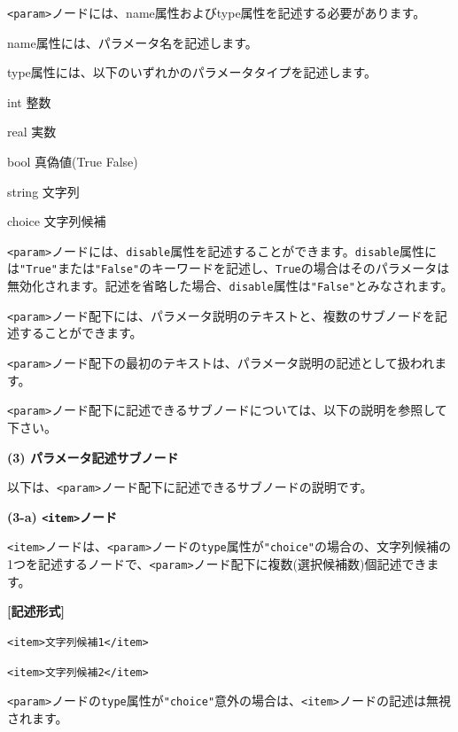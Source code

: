 \documentclass[a4paper,11pt]{jarticle}
\begin{document}
{\vspace{8pt}
\leftskip=0pt
\texttt{<param>}ノードには、name属性およびtype属性を記述する必要があります。

name属性には、パラメータ名を記述します。

type属性には、以下のいずれかのパラメータタイプを記述します。

\parindent=18pt
int 整数

real 実数

bool 真偽値(True \textbar{} False)

string 文字列

choice 文字列候補

\parindent=0pt
\texttt{<param>}ノードには、{\tt disable}属性を記述することができます。{\tt disable}属性には\texttt{"True"}または\texttt{"False"}のキーワードを記述し、{\tt True}の場合はそのパラメータは無効化されます。記述を省略した場合、{\tt disable}属性は\texttt{"False"}とみなされます。

\vspace{12pt}
\texttt{<param>}ノード配下には、パラメータ説明のテキストと、複数のサブノードを記述することができます。

\texttt{<param>}ノード配下の最初のテキストは、パラメータ説明の記述として扱われます。

\texttt{<param>}ノード配下に記述できるサブノードについては、以下の説明を参照して下さい。

\vspace{12pt}
\textbf{(3) パラメータ記述サブノード}

以下は、\texttt{<param>}ノード配下に記述できるサブノードの説明です。

\vspace{12pt}
\textbf{(3-a) \texttt{<item>}ノード }

\parindent=3pt
\texttt{<item>}ノードは、\texttt{<param>}ノードの{\tt type}属性が\texttt{"choice"}の場合の、文字列候補の1つを記述するノードで、\texttt{<param>}ノード配下に複数(選択候補数)個記述できます。

\vspace{8pt}
\parindent=0pt
\leftskip=12pt
\textbf{[記述形式]}

\leftskip=42pt
\texttt{<item>文字列候補1</item>}

\texttt{<item>文字列候補2</item>}

\vspace{8pt}
\leftskip=0pt
\texttt{<param>}ノードの{\tt type}属性が\texttt{"choice"}意外の場合は、\texttt{<item>}ノードの記述は無視されます。

}
\end{document}
